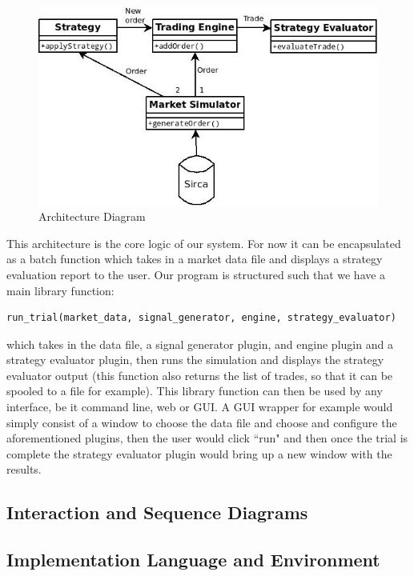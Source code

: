 \documentclass{article}
\begin{document}
\begin{figure}
  \centering
  \includegraphics[width=\textwidth]{architecture}
  \caption{Architecture Diagram}
\end{figure}

This architecture is the core logic of our system. For now it can be encapsulated as a batch function which takes in a market data file and displays a strategy evaluation report to the user. Our program is structured such that we have a main library function:
\begin{verbatim}
run_trial(market_data, signal_generator, engine, strategy_evaluator)
\end{verbatim}

which takes in the data file, a signal generator plugin, and engine plugin and a strategy evaluator plugin, then runs the simulation and displays the strategy evaluator output (this function also returns the list of trades, so that it can be spooled to a file for example). This library function can then be used by any interface, be it command line, web or GUI\@. A GUI wrapper for example would simply consist of a window to choose the data file and choose and configure the aforementioned plugins, then the user would click ``run" and then once the trial is complete the strategy evaluator plugin would bring up a new window with the results.

\subsection{Interaction and Sequence Diagrams}

\subsection{Implementation Language and Environment}
\end{document}
